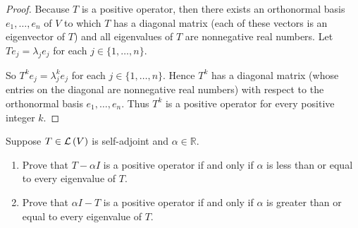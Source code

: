 \begin{proof}
    Because $T$ is a positive operator, then there exists an orthonormal basis $e_{1}, \ldots, e_{n}$ of $V$ to which $T$ has a diagonal matrix (each of these vectors is an eigenvector of $T$) and all eigenvalues of $T$ are nonnegative real numbers. Let $Te_{j} = \lambda_{j}e_{j}$ for each $j\in\{ 1, \ldots, n \}$.

    So $T^{k}e_{j} = \lambda_{j}^{k}e_{j}$ for each $j\in\{ 1, \ldots, n \}$. Hence $T^{k}$ has a diagonal matrix (whose entries on the diagonal are nonnegative real numbers) with respect to the orthonormal basis $e_{1}, \ldots, e_{n}$. Thus $T^{k}$ is a positive operator for every positive integer $k$.
\end{proof}

\newpage

\begin{exercise}\label{chapter7:sectionC:exercise13}
    Suppose $T \in \mathcal{L}\left({V}\right)$ is self-adjoint and $\alpha\in\mathbb{R}$.
    \begin{enumerate}[label={(\alph*)}]
        \item Prove that $T - \alpha I$ is a positive operator if and only if $\alpha$ is less than or equal to every eigenvalue of $T$.
        \item Prove that $\alpha I - T$ is a positive operator if and only if $\alpha$ is greater than or equal to every eigenvalue of $T$.
    \end{enumerate}
\end{exercise}

